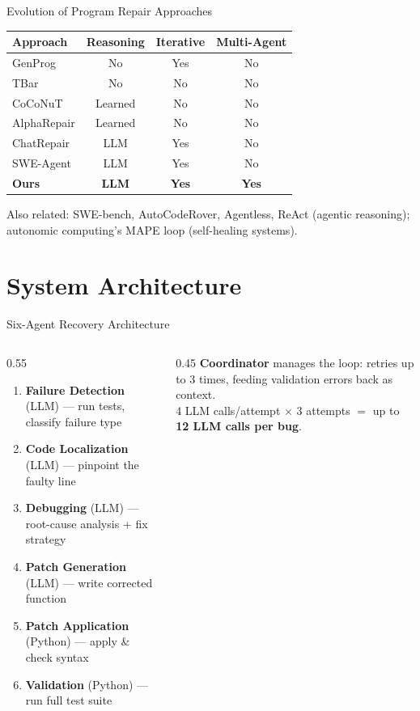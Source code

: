 \documentclass[aspectratio=169]{beamer}
\begin{document}
\begin{frame}{Evolution of Program Repair Approaches}
\begin{table}
\centering
\small
\begin{tabular}{lccc}
\toprule
\textbf{Approach} & \textbf{Reasoning} & \textbf{Iterative} & \textbf{Multi-Agent} \\
\midrule
GenProg & No & Yes & No \\
TBar & No & No & No \\
CoCoNuT & Learned & No & No \\
AlphaRepair & Learned & No & No \\
ChatRepair & LLM & Yes & No \\
SWE-Agent & LLM & Yes & No \\
\textbf{Ours} & \textbf{LLM} & \textbf{Yes} & \textbf{Yes} \\
\bottomrule
\end{tabular}
\end{table}
\vspace{4pt}
Also related: SWE-bench, AutoCodeRover, Agentless, ReAct (agentic reasoning); autonomic computing's MAPE loop (self-healing systems).
\end{frame}

\section{System Architecture}

\begin{frame}{Six-Agent Recovery Architecture}
\begin{columns}
\begin{column}{0.55\textwidth}
\begin{enumerate}
    \item \textbf{Failure Detection} (LLM) --- run tests, classify failure type
    \item \textbf{Code Localization} (LLM) --- pinpoint the faulty line
    \item \textbf{Debugging} (LLM) --- root-cause analysis + fix strategy
    \item \textbf{Patch Generation} (LLM) --- write corrected function
    \item \textbf{Patch Application} (Python) --- apply \& check syntax
    \item \textbf{Validation} (Python) --- run full test suite
\end{enumerate}
\end{column}
\begin{column}{0.45\textwidth}
\small
\textbf{Coordinator} manages the loop: retries up to 3 times, feeding validation errors back as context.\\[8pt]
4 LLM calls/attempt $\times$ 3 attempts $=$ up to \textbf{12 LLM calls per bug}.
\end{column}
\end{columns}
\end{frame}
\end{document}
